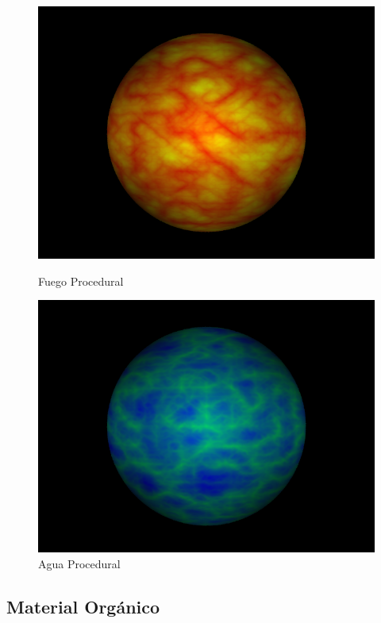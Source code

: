 \documentclass[a4paper,10pt]{article}
\begin{document}
\begin{figure}[ht]
\begin{minipage}[b]{0.5\linewidth}
\centering
\includegraphics[scale=0.28]{proceduralFire.png}
\caption{Fuego Procedural}
\label{fig:figure1}
\end{minipage}
\hspace{0.5cm}
\begin{minipage}[b]{0.5\linewidth}
\centering
\includegraphics[scale=0.28]{proceduralWater.png}
\caption{Agua Procedural}
\label{fig:figure2}
\end{minipage}
\end{figure}

\subsection{Material Orgánico}
\end{document}
